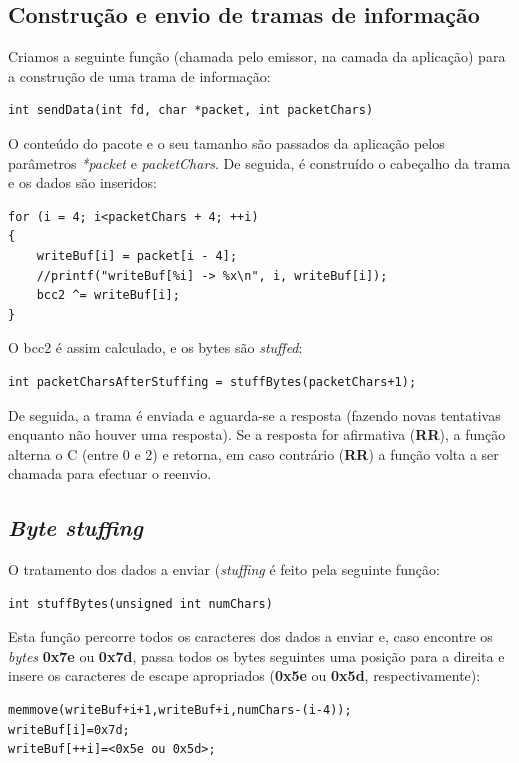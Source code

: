 \documentclass[a4paper,11pt]{article}
\begin{document}
\subsection{Construção e envio de tramas de informação}

Criamos a seguinte função (chamada pelo emissor, na camada da aplicação) para a construção de uma trama de informação:

\begin{lstlisting}
int sendData(int fd, char *packet, int packetChars)
\end{lstlisting}

O conteúdo do pacote e o seu tamanho são passados da aplicação pelos parâmetros \textit{*packet} e \textit{packetChars}.
De seguida, é construído o cabeçalho da trama e os dados são inseridos:
\begin{lstlisting}
for (i = 4; i<packetChars + 4; ++i)
{
    writeBuf[i] = packet[i - 4];
    //printf("writeBuf[%i] -> %x\n", i, writeBuf[i]);
    bcc2 ^= writeBuf[i];
}
\end{lstlisting}

O bcc2 é assim calculado, e os bytes são \textit{stuffed}:
\begin{lstlisting}
int packetCharsAfterStuffing = stuffBytes(packetChars+1);
\end{lstlisting}
De seguida, a trama é enviada e aguarda-se a resposta (fazendo novas tentativas enquanto não houver uma resposta).
Se a resposta for afirmativa (\textbf{RR}), a função alterna o C (entre 0 e 2) e retorna, em caso contrário (\textbf{RR}) a função volta a ser chamada para efectuar o reenvio.

\subsection{\textit{Byte stuffing}}
O tratamento dos dados a enviar (\textit{stuffing} é feito pela seguinte função:
\begin{lstlisting}
int stuffBytes(unsigned int numChars)
\end{lstlisting}
Esta função percorre todos os caracteres dos dados a enviar e, caso encontre os \textit{bytes} \textbf{0x7e} ou \textbf{0x7d}, passa todos os bytes seguintes uma posição para a direita e insere os caracteres de escape apropriados (\textbf{0x5e} ou \textbf{0x5d}, respectivamente):
\begin{lstlisting}
memmove(writeBuf+i+1,writeBuf+i,numChars-(i-4));
writeBuf[i]=0x7d;
writeBuf[++i]=<0x5e ou 0x5d>;
\end{lstlisting}
\end{document}
